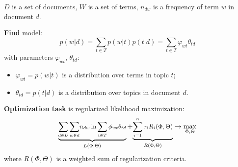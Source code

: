 \documentclass[portrait,final,a1paper,fontscale=0.401]{baposter}
\begin{document}
\begin{poster}
{	$ D $ is a set of documents, $ W $ is a set of terms, $n_{dw}$ is a frequency of term $w$ in document $d$. %
	
	\medskip\textbf{Find} model: 
	\[ 
	p(w|d) = \sum_{t\in T} p(w|t) p(t|d) = \sum_{t\in T} \varphi_{wt} \theta_{td}
	\] 
	with parameters $\varphi_{wt}$, $\theta_{td}$:
	\begin{itemize}
	\item $ \varphi_{wt} = p(w|t) $ is a distribution over terms in topic $ t $;
	\item $ \theta_{td} = p(t|d) $ is a distribution over topics in document $ d $. 
	\end{itemize}
	
	\textbf{Optimization task} is
	regularized likelihood maximization:
  \[\small
        \underbrace{\sum_{d\in D} \sum_{w\in d} \!n_{dw} \ln \sum_{t\in T} \phi_{wt}\theta_{td}}_{L(\Phi,\Theta)}
        +
        {\underbrace{{\sum_{i=1}^n \tau_i R_i(\Phi,\Theta)}}_{R(\Phi,\Theta)}}
        \to \max _{\Phi,\Theta}
   \]
	 where $R(\Phi, \Theta)$ is a weighted sum of regularization criteria.
  }





\end{poster}
\end{document}
